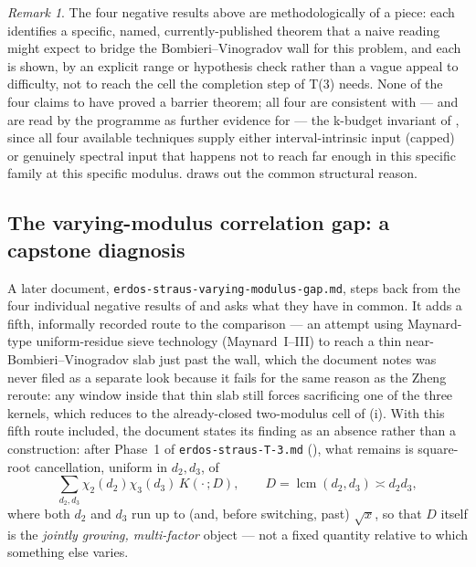 \documentclass[11pt]{article}
\theoremstyle{plain}
\theoremstyle{definition}
\theoremstyle{remark}
\newtheorem{remark}[theorem]{Remark}
\renewcommand{\_}{\textunderscore\allowbreak}
\begin{document}
\begin{remark}
The four negative results above are methodologically of a piece: each identifies a specific,
named, currently-published theorem that a naive reading might expect to bridge the
Bombieri--Vinogradov wall for this problem, and each is shown, by an explicit range or hypothesis
check rather than a vague appeal to difficulty, not to reach the cell the completion step of
T(3) needs. None of the four claims to have proved a barrier theorem; all four are consistent
with — and are read by the programme as further evidence for — the k-budget invariant of
, since all four available techniques supply either interval-intrinsic
input (capped) or genuinely spectral input that happens not to reach far enough in this specific
family at this specific modulus.  draws out the common structural
reason.
\end{remark}

\subsection{The varying-modulus correlation gap: a capstone diagnosis}
\label{subsec:varyingmodulus}

A later document, \texttt{erdos-\allowbreak straus-\allowbreak varying-\allowbreak modulus-\allowbreak gap.md}, steps back from the four
individual negative results of  and asks what they have in common. It
adds a fifth, informally recorded route to the comparison — an attempt using Maynard-type
uniform-residue sieve technology (Maynard~I--III) to reach a thin near-Bombieri--Vinogradov slab
just past the wall, which the document notes was never filed as a separate look because it fails
for the same reason as the Zheng reroute: any window inside that thin slab still forces
sacrificing one of the three kernels, which reduces to the already-closed two-modulus cell of
(i). With this fifth route included, the document states its finding as
an absence rather than a construction: after Phase~1 of \texttt{erdos-\allowbreak straus-\allowbreak T-\allowbreak 3.md}
(), what remains is square-root cancellation, uniform in $d_2,d_3$, of
\[
\sum_{d_2,d_3}\chi_2(d_2)\chi_3(d_3)\,K(\cdot\,;D), \qquad D=\operatorname{lcm}(d_2,d_3)\asymp d_2d_3,
\]
where both $d_2$ and $d_3$ run up to (and, before switching, past) $\sqrt x$, so that $D$ itself
is the \emph{jointly growing, multi-factor} object — not a fixed quantity relative to which
something else varies.
\end{document}
